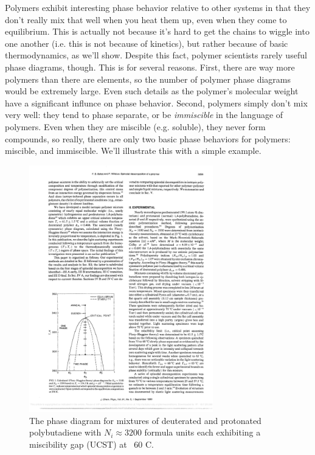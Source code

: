 \documentclass[12pt]{article}
\begin{document}
Polymers exhibit  interesting phase behavior relative to other systems in that they don't really mix that well when you heat them up, even when they come to equilibrium. This is actually not because it's hard to get the chains to wiggle into one another (i.e. this is not because of kinetics), but rather because of basic thermodynamics, as we'll show. Despite this fact, polymer scientists rarely useful phase diagrams, though. This is for several reasons. First, there are way more polymers than there are elements, so the number of polymer phase diagrams would be extremely large. Even such details as the polymer's molecular weight have a significant influnce on phase behavior. Second, polymers simply don't mix very well: they tend to phase separate, or be \emph{immiscible} in the language of polymers. Even when they are miscible (e.g. soluble), they never form compounds, so really, there are only two basic phase behaviors for polymers: miscible, and immiscible. We'll illustrate this with a simple example. 

\begin{figure}[h]
\centering
\includegraphics[width=8cm]{deuterated_comparing}
\caption{The phase diagram for mixtures of deuterated and protonated polybutadiene with $N_i\approx3200$ formula units each exhibiting a miscibility gap (UCST) at ~60 \degree C.}
\label{deuterated_comparison}
\end{figure}
\end{document}
